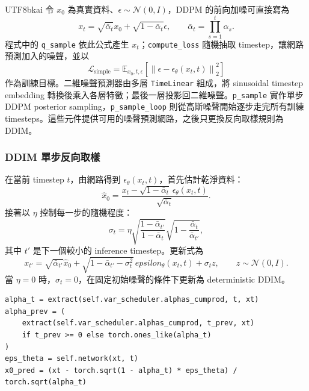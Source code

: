 \documentclass[11pt,a4paper]{article}
\newcommand{\code}[1]{\texttt{#1}}
\begin{document}
\begin{CJK*}{UTF8}{bkai}
令 $x_0$ 為真實資料、$\epsilon\sim\mathcal{N}(0,I)$，DDPM 的前向加噪可直接寫為
\begin{equation}
  x_t=\sqrt{\bar{\alpha}_t}x_0+\sqrt{1-\bar{\alpha}_t}\epsilon,
  \qquad
  \bar{\alpha}_t=\prod_{s=1}^{t}\alpha_s.
\end{equation}
程式中的 \code{q\_sample} 依此公式產生 $x_t$；\code{compute\_loss} 隨機抽取 timestep，讓網路預測加入的噪聲，並以
\begin{equation}
  \mathcal{L}_{\mathrm{simple}}
  =\mathbb{E}_{x_0,t,\epsilon}
  \left[\left\|\epsilon-\epsilon_\theta(x_t,t)\right\|_2^2\right]
\end{equation}
作為訓練目標。二維噪聲預測器由多層 \code{TimeLinear} 組成，將 sinusoidal timestep embedding 轉換後乘入各層特徵；最後一層投影回二維噪聲。\code{p\_sample} 實作單步 DDPM posterior sampling，\code{p\_sample\_loop} 則從高斯噪聲開始逐步走完所有訓練 timesteps。這些元件提供可用的噪聲預測網路，之後只更換反向取樣規則為 DDIM。

\subsubsection{DDIM 單步反向取樣}

在當前 timestep $t$，由網路得到 $\epsilon_\theta(x_t,t)$，首先估計乾淨資料：
\begin{equation}
  \hat{x}_0=
  \frac{x_t-\sqrt{1-\bar{\alpha}_t}\,\epsilon_\theta(x_t,t)}
       {\sqrt{\bar{\alpha}_t}}.
\end{equation}
接著以 $\eta$ 控制每一步的隨機程度：
\begin{equation}
  \sigma_t=\eta
  \sqrt{\frac{1-\bar{\alpha}_{t'}}{1-\bar{\alpha}_t}}
  \sqrt{1-\frac{\bar{\alpha}_t}{\bar{\alpha}_{t'}}},
\end{equation}
其中 $t'$ 是下一個較小的 inference timestep。更新式為
\begin{equation}
  x_{t'}=
  \sqrt{\bar{\alpha}_{t'}}\hat{x}_0
  +\sqrt{1-\bar{\alpha}_{t'}-\sigma_t^2}\,epsilon_\theta(x_t,t)
  +\sigma_t z,
  \qquad z\sim\mathcal{N}(0,I).
\end{equation}
當 $\eta=0$ 時，$\sigma_t=0$，在固定初始噪聲的條件下更新為 deterministic DDIM。

\begin{lstlisting}[caption={\code{ddim\_p\_sample}}]
alpha_t = extract(self.var_scheduler.alphas_cumprod, t, xt)
alpha_prev = (
    extract(self.var_scheduler.alphas_cumprod, t_prev, xt)
    if t_prev >= 0 else torch.ones_like(alpha_t)
)
eps_theta = self.network(xt, t)
x0_pred = (xt - torch.sqrt(1 - alpha_t) * eps_theta) / torch.sqrt(alpha_t)


\end{lstlisting}
\end{CJK*}
\end{document}
